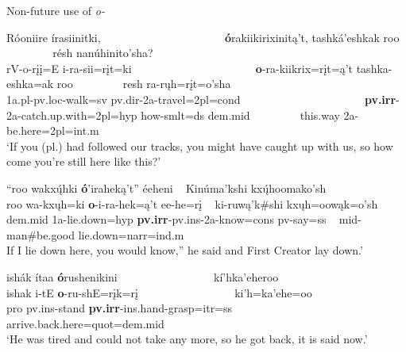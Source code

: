 \begin{exe}

\item\label{irrealisnotfuture} Non-future use of \textit{o-}

\begin{xlist}

\item\label{irrealisnotfuture1} 
	\glll Róoniire írasiinitki, ~ ~ ~ ~ ~ ~ ~ ~ ~ ~ ~ ~ ~ \textbf{ó}rakiikirixinitą't, tashká'eshkak roo ~ ~ ~ ~ ~ résh nanúhinito'sha?\\
	rV-o-rįį=E i-ra-sii=rįt=ki ~ ~ ~ ~ ~ ~ ~ ~ ~ ~ ~ ~ ~  \textbf{o}-ra-kiikrix=rįt=ą't tashka-eshka=ak roo ~ ~ ~ ~ ~ resh ra-rųh=rįt=o'sha\\
	1a.pl-pv.loc-\textnormal{walk}=sv pv.dir-2a-\textnormal{travel}=2pl=cond  ~ ~ ~ ~ ~ ~ ~ ~ ~ ~ ~ ~ ~  \textbf{pv.irr}-2a-\textnormal{catch.up.with}=2pl=hyp \textnormal{how}-smlt=ds dem.mid ~ ~ ~ ~ ~ \textnormal{this.way} 2a-\textnormal{be.here}=2pl=int.m\\
\glt 	`If you (pl.) had followed our tracks, you might have caught up with us, so how come you're still here like this?' \citep[208]{hollow1973a}

\item\label{irrealisnotfuture2} \glll ``roo wakxų́hki \textbf{ó}'iraheką't'' éeheni ~ Kinúma'kshi kxų́hoomako'sh\\
    roo wa-kxųh=ki \textbf{o}-i-ra-hek=ą't ee-he=rį ~ ki-ruwą'k\#shi kxųh=oowąk=o'sh\\
	dem.mid 1a-\textnormal{lie.down}=hyp \textbf{pv.irr}-pv.ins-2a-\textnormal{know}=cons pv-\textnormal{say}=ss ~ mid-\textnormal{man\#be.good} \textnormal{lie.down}=narr=ind.m\\
	If I lie down here, you would know,'' he said and First Creator lay down.' \citep[1]{hollow1973a}
	
	\item\label{irrealisnotfuture3} \glll ishák ítaa \textbf{ó}rushenikini ~ ~ ~ ~ ~ ~ ~ ~ ~ ~ kí'hka'eheroo\\
	ishak i-tE \textbf{o}-ru-shE=rįk=rį ~ ~ ~ ~ ~ ~ ~ ~ ~ ~  ki'h=ka'ehe=oo\\
	pro pv.ins-\textnormal{stand} \textbf{pv.irr}-ins.hand-\textnormal{grasp}=itr=ss ~ ~ ~ ~ ~ ~ ~ ~ ~ ~  \textnormal{arrive.back.here}=quot=dem.mid\\
	\glt `He was tired and could not take any more, so he got back, it is said now.' \citep[124]{hollow1973a}
	
	\end{xlist}
	
\end{exe}

